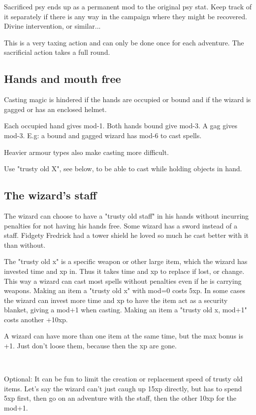 Sacrificed psy ends up as a permanent mod to the original psy stat. Keep track of it separately if there is any way in the campaign where they might be recovered. Divine intervention, or similar...

This is a very taxing action and can only be done once for each adventure. The sacrificial action takes a full round.


\subsection*{Hands and mouth free}
Casting magic is hindered if the hands are occupied or bound and if the wizard is gagged or has an enclosed helmet.

Each occupied hand gives mod-1. Both hands bound give mod-3. A gag gives mod-3.
E.g: a bound and gagged wizard has mod-6 to cast spells.

Heavier armour types also make casting more difficult.

Use "trusty old X", see below, to be able to cast while holding objects in hand.


\subsection*{The wizard's staff}
The wizard can choose to have a "trusty old staff" in his hands without incurring penalties for not having his hands free. Some wizard has a sword instead of a staff. Fidgety Fredrick had a tower shield he loved so much he cast better with it than without.

The "trusty old x" is a specific weapon or other large item, which the wizard has invested time and xp in. Thus it takes time and xp to replace if lost, or change. This way a wizard can cast most spells without penalties even if he is carrying weapons. Making an item a "trusty old x" with mod=0 costs 5xp. 
In some cases the wizard can invest more time and xp to have the item act as a security blanket, giving a mod+1 when casting. Making an item a "trusty old x, mod+1" costs another +10xp.

A wizard can have more than one item at the same time, but the max bonus is +1. Just don't loose them, because then the xp are gone.

\

Optional: It can be fun to limit the creation or replacement speed of trusty old items. Let's say the wizard can't just caugh up 15xp directly, but has to spend 5xp first, then go on an adventure with the staff, then the other 10xp for the mod+1.

